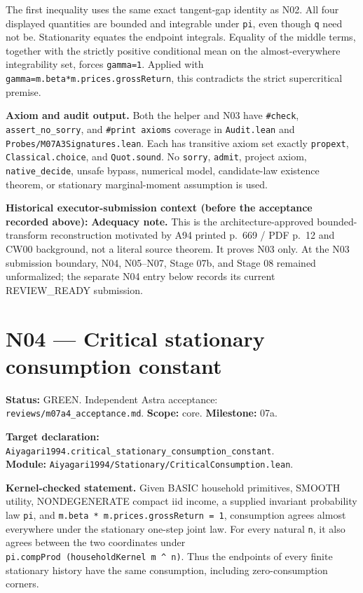 \documentclass[
  11pt,
]{article}
\let\LedgerOriginalTexttt\texttt
\renewcommand{\texttt}[1]{{\small\LedgerOriginalTexttt{#1}}}
\begin{document}
The first inequality uses the same exact tangent-gap identity as N02.
All four displayed quantities are bounded and integrable under
\texttt{pi}, even though \texttt{q} need not be. Stationarity equates
the endpoint integrals. Equality of the middle terms, together with the
strictly positive conditional mean on the almost-everywhere
integrability set, forces \texttt{gamma=1}. Applied with
\texttt{gamma=m.beta*m.prices.grossReturn}, this contradicts the strict
supercritical premise.

\textbf{Axiom and audit output.} Both the helper and N03 have
\texttt{\#check}, \texttt{assert\_no\_sorry}, and
\texttt{\#print\ axioms} coverage in \texttt{Audit.lean} and
\texttt{Probes/M07A3Signatures.lean}. Each has transitive axiom set
exactly \texttt{propext}, \texttt{Classical.choice}, and
\texttt{Quot.sound}. No \texttt{sorry}, \texttt{admit}, project axiom,
\texttt{native\_decide}, unsafe bypass, numerical model, candidate-law
existence theorem, or stationary marginal-moment assumption is used.

\textbf{Historical executor-submission context (before the acceptance
recorded above):} \textbf{Adequacy note.} This is the
architecture-approved bounded-transform reconstruction motivated by A94
printed p.~669 / PDF p.~12 and CW00 background, not a literal source
theorem. It proves N03 only. At the N03 submission boundary, N04,
N05--N07, Stage 07b, and Stage 08 remained unformalized; the separate
N04 entry below records its current REVIEW\_READY submission.

\section{N04 --- Critical stationary consumption
constant}\label{n04-critical-stationary-consumption-constant}

\textbf{Status:} GREEN. Independent Astra acceptance:
\texttt{reviews/m07a4\_acceptance.md}. \textbf{Scope:} core.
\textbf{Milestone:} 07a.

\textbf{Target declaration:}
\texttt{Aiyagari1994.critical\_stationary\_consumption\_constant}.\\
\textbf{Module:}
\texttt{Aiyagari1994/Stationary/CriticalConsumption.lean}.

\textbf{Kernel-checked statement.} Given BASIC household primitives,
SMOOTH utility, NONDEGENERATE compact iid income, a supplied invariant
probability law \texttt{pi}, and
\texttt{m.beta\ *\ m.prices.grossReturn\ =\ 1}, consumption agrees
almost everywhere under the stationary one-step joint law. For every
natural \texttt{n}, it also agrees between the two coordinates under
\texttt{pi.compProd\ (householdKernel\ m\ \^{}\ n)}. Thus the endpoints
of every finite stationary history have the same consumption, including
zero-consumption corners.
\end{document}
